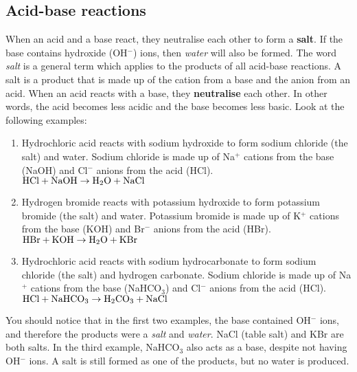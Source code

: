 \subsection{Acid-base reactions}

When an acid and a base react, they neutralise each other to form a \textbf{salt}. If the base contains hydroxide (OH$^{-}$)  ions, then \textit{water} will also be formed. The word \textit{salt} is a general term which applies to the products of all acid-base reactions. A salt is a product that is made up of the cation from a base and the anion from an acid. When an acid reacts with a base, they \textbf{neutralise} each other. In other words, the acid becomes less acidic and the base becomes less basic. Look at the following examples:\\

\begin{enumerate}
\item{Hydrochloric acid reacts with sodium hydroxide to form sodium chloride (the salt) and water. Sodium chloride is made up of Na$^{+}$ cations from the base (NaOH) and Cl$^{-}$ anions from the acid (HCl). \\

$\rm{HCl + NaOH \rightarrow H_{2}O + NaCl}$
}

\item{Hydrogen bromide reacts with potassium hydroxide to form potassium bromide (the salt) and water. Potassium bromide is made up of K$^{+}$ cations from the base (KOH) and Br$^{-}$ anions from the acid (HBr).\\

$\rm{HBr + KOH \rightarrow H_{2}O +KBr}$
}

\item{Hydrochloric acid reacts with sodium hydrocarbonate to form sodium chloride (the salt) and hydrogen carbonate. Sodium chloride is made up of Na$^{+}$ cations from the base (NaHCO$_{3}$) and Cl$^{-}$ anions from the acid (HCl).\\

$\rm{HCl + NaHCO_{3} \rightarrow H_{2}CO_{3} + NaCl}$
}
\end{enumerate}

You should notice that in the first two examples, the base contained OH$^{-}$ ions, and therefore the products were a \textit{salt} and \textit{water}. NaCl (table salt) and KBr are both salts. In the third example, NaHCO$_{3}$ also acts as a base, despite not having OH$^{-}$ ions. A salt is still formed as one of the products, but no water is produced.\\

